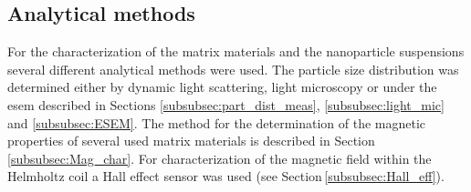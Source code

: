  

\subsection{Analytical methods}
\label{subsec:ana_met}
 For the characterization of the matrix materials and the nanoparticle suspensions several different analytical methods were used. The particle size distribution was determined either by dynamic light scattering, light microscopy or under the \gls{esem} described in Sections \ref{subsubsec:part_dist_meas}, \ref{subsubsec:light_mic} and \ref{subsubsec:ESEM}. The method for the determination of the magnetic properties of several used matrix materials is described in Section\,\ref{subsubsec:Mag_char}. For characterization of the magnetic field within the Helmholtz coil a Hall effect sensor was used (see Section\,\ref{subsubsec:Hall_eff}).   
 
 
